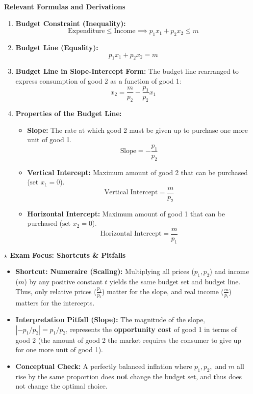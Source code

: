 \documentclass{article}
\begin{document}
\textbf{Relevant Formulas and Derivations}

\begin{enumerate}
    \item \textbf{Budget Constraint (Inequality):} $$\text{Expenditure} \leq \text{Income} \implies p_1 x_1 + p_2 x_2 \leq m$$
    \item \textbf{Budget Line (Equality):} $$p_1 x_1 + p_2 x_2 = m$$
    \item \textbf{Budget Line in Slope-Intercept Form:} The budget line rearranged to express consumption of good 2 as a function of good 1: $$x_2 = \frac{m}{p_2} - \frac{p_1}{p_2} x_1$$
    \item \textbf{Properties of the Budget Line:}
    \begin{itemize}
        \item \textbf{Slope:} The rate at which good 2 must be given up to purchase one more unit of good 1. $$\text{Slope} = -\frac{p_1}{p_2}$$
        \item \textbf{Vertical Intercept:} Maximum amount of good 2 that can be purchased ($\text{set } x_1 = 0$). $$\text{Vertical Intercept} = \frac{m}{p_2}$$
        \item \textbf{Horizontal Intercept:} Maximum amount of good 1 that can be purchased ($\text{set } x_2 = 0$). $$\text{Horizontal Intercept} = \frac{m}{p_1}$$
    \end{itemize}
\end{enumerate}

\textbf{$\star$ Exam Focus: Shortcuts \& Pitfalls}

\begin{itemize}
    \item \textbf{Shortcut: Numeraire (Scaling):} Multiplying all prices ($p_1, p_2$) and income ($m$) by any positive constant $t$ yields the same budget set and budget line. Thus, only relative prices ($\frac{p_1}{p_2}$) matter for the slope, and real income ($\frac{m}{p_i}$) matters for the intercepts.
    \item \textbf{Interpretation Pitfall (Slope):} The magnitude of the slope, $|-p_1/p_2| = p_1/p_2$, represents the \textbf{opportunity cost} of good 1 in terms of good 2 (the amount of good 2 the market requires the consumer to give up for one more unit of good 1).
    \item \textbf{Conceptual Check:} A perfectly balanced inflation where $p_1, p_2,$ and $m$ all rise by the same proportion does \textbf{not} change the budget set, and thus does not change the optimal choice.
\end{itemize}
\end{document}
